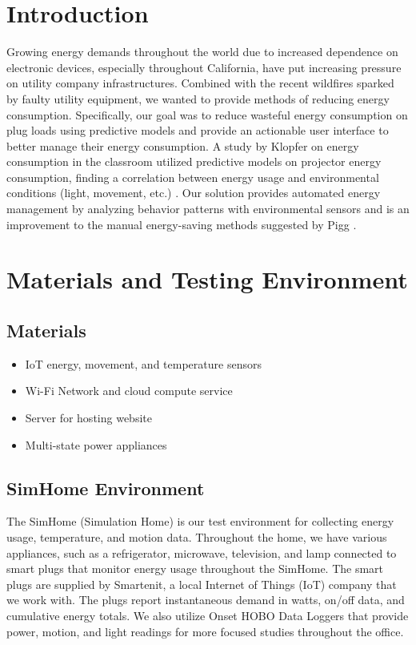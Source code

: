 \documentclass[conference]{IEEEtran}
\begin{document}


\section{Introduction}
Growing energy demands throughout the world due to increased dependence on electronic devices, especially throughout California, have put increasing pressure on utility company infrastructures. Combined with the recent wildfires sparked by faulty utility equipment, we wanted to provide methods of reducing energy consumption. Specifically, our goal was to reduce wasteful energy consumption on plug loads using predictive models and provide an actionable user interface to better manage their energy consumption. A study by Klopfer on energy consumption in the classroom utilized predictive models on projector energy consumption, finding a correlation between energy usage and environmental conditions (light, movement, etc.) \cite{b3}. Our solution provides automated energy management by analyzing behavior patterns with environmental sensors and is an improvement to the manual energy-saving methods suggested by Pigg \cite{b2}.

\section{Materials and Testing Environment}
\subsection{Materials}
\begin{itemize}
    \item IoT energy, movement, and temperature sensors
    \item Wi-Fi Network and cloud compute service
    \item Server for hosting website
    \item Multi-state power appliances
\end{itemize}

\subsection{SimHome Environment}
The SimHome (Simulation Home) is our test environment for collecting energy usage, temperature, and motion data. Throughout the home, we have various appliances, such as a refrigerator, microwave, television, and lamp connected to smart plugs that monitor energy usage throughout the SimHome. The smart plugs are supplied by Smartenit, a local Internet of Things (IoT) company that we work with. The plugs report instantaneous demand in watts, on/off data, and cumulative energy totals. We also utilize Onset HOBO Data Loggers that provide power, motion, and light readings for more focused studies throughout the office.
\end{document}
